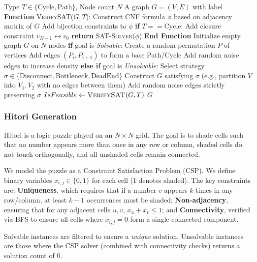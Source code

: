 \begin{algorithm}[t]
\caption{Hamiltonian Graph Generation}
\label{alg:hamiltonian}
\begin{algorithmic}[1]
\REQUIRE Type $T \in \{\text{Cycle}, \text{Path}\}$, Node count $N$
\ENSURE A graph $G=(V,E)$ with label
\STATE \textbf{Function} \textsc{VerifySAT}($G, T$):
\STATE \quad Construct CNF formula $\phi$ based on adjacency matrix of $G$
\STATE \quad Add bijection constraints to $\phi$
\STATE \quad \textbf{if} $T == \text{Cycle}$: Add closure constraint $v_{N-1} \leftrightarrow v_0$
\STATE \quad \textbf{return} \textsc{SAT-Solver}($\phi$)
\STATE \textbf{End Function}
\REPEAT
\STATE Initialize empty graph $G$ on $N$ nodes
\STATE \textbf{if} goal is \textit{Solvable}:
\STATE \quad Create a random permutation $P$ of vertices
\STATE \quad Add edges $(P_i, P_{i+1})$ to form a base Path/Cycle
\STATE \quad Add random noise edges to increase density
\STATE \textbf{else if} goal is \textit{Unsolvable}:
\STATE \quad Select strategy $\sigma \in \{\text{Disconnect}, \text{Bottleneck}, \text{DeadEnd}\}$
\STATE \quad Construct $G$ satisfying $\sigma$ (e.g., partition $V$ into $V_1, V_2$ with no edges between them)
\STATE \quad Add random noise edges strictly preserving $\sigma$
\STATE $IsFeasible \leftarrow \textsc{VerifySAT}(G, T)$
\RETURN $G$
\end{algorithmic}
\end{algorithm}

\subsubsection{Hitori Generation}
Hitori is a logic puzzle played on an $N \times N$ grid. The goal is to shade cells such that no number appears more than once in any row or column, shaded cells do not touch orthogonally, and all unshaded cells remain connected.

We model the puzzle as a Constraint Satisfaction Problem (CSP). We define binary variables $x_{i,j} \in \{0, 1\}$ for each cell ($1$ denotes shaded). The key constraints are: \textbf{Uniqueness}, which requires that if a number $v$ appears $k$ times in any row/column, at least $k-1$ occurrences must be shaded; \textbf{Non-adjacency}, ensuring that for any adjacent cells $u, v$, $x_u + x_v \le 1$; and \textbf{Connectivity}, verified via BFS to ensure all cells where $x_{i,j}=0$ form a single connected component.

Solvable instances are filtered to ensure a \textit{unique} solution. Unsolvable instances are those where the CSP solver (combined with connectivity checks) returns a solution count of 0.

